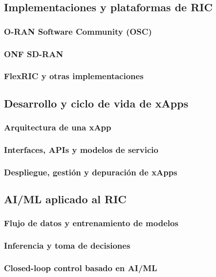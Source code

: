 \documentclass[11pt,a4paper]{article}
\makeatletter
\let\ORIGsubsection\subsection
\def\subsection{\@nobreakfalse\ORIGsubsection}
\let\ORIGsubsubsection\subsubsection
\def\subsubsection{\@nobreakfalse\ORIGsubsubsection}
\makeatother
\begin{document}
\subsection{Implementaciones y plataformas de RIC}

\subsubsection{O-RAN Software Community (OSC)}
\subsubsection{ONF SD-RAN}
\subsubsection{FlexRIC y otras implementaciones}

\subsection{Desarrollo y ciclo de vida de xApps}

\subsubsection{Arquitectura de una xApp}
\subsubsection{Interfaces, APIs y modelos de servicio}
\subsubsection{Despliegue, gestión y depuración de xApps}

\subsection{AI/ML aplicado al RIC}

\subsubsection{Flujo de datos y entrenamiento de modelos}
\subsubsection{Inferencia y toma de decisiones}
\subsubsection{Closed-loop control basado en AI/ML}
\end{document}

